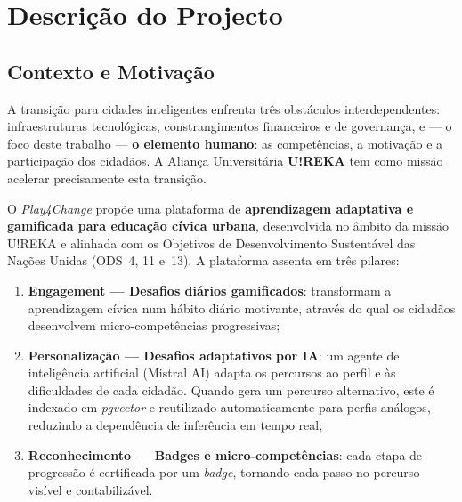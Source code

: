 \documentclass[12pt,a4paper]{article}
\begin{document}
\newpage
\pagestyle{fancy}

\tableofcontents
\newpage

\section{Descrição do Projecto}

\subsection{Contexto e Motivação}

A transição para cidades inteligentes enfrenta três obstáculos interdependentes: infraestruturas tecnológicas, constrangimentos financeiros e de governança, e --- o foco deste trabalho --- \textbf{o elemento humano}: as competências, a motivação e a participação dos cidadãos. A Aliança Universitária \textbf{U!REKA} tem como missão acelerar precisamente esta transição.

O \textit{Play4Change} propõe uma plataforma de \textbf{aprendizagem adaptativa e gamificada para educação cívica urbana}, desenvolvida no âmbito da missão U!REKA e alinhada com os Objetivos de Desenvolvimento Sustentável das Nações Unidas (ODS~4, 11 e~13). A plataforma assenta em três pilares:

\begin{enumerate}
  \item \textbf{Engagement --- Desafios diários gamificados}: transformam a aprendizagem cívica num hábito diário motivante, através do qual os cidadãos desenvolvem micro-competências progressivas;

  \item \textbf{Personalização --- Desafios adaptativos por IA}: um agente de inteligência artificial (Mistral AI) adapta os percursos ao perfil e às dificuldades de cada cidadão. Quando gera um percurso alternativo, este é indexado em \textit{pgvector} e reutilizado automaticamente para perfis análogos, reduzindo a dependência de inferência em tempo real;

  \item \textbf{Reconhecimento --- Badges e micro-competências}: cada etapa de progressão é certificada por um \textit{badge}, tornando cada passo no percurso visível e contabilizável.
\end{enumerate}
\end{document}
